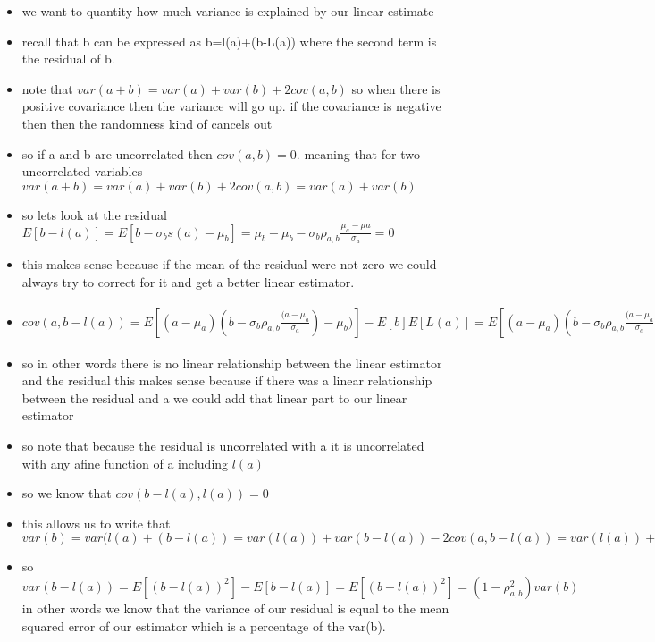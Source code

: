 \documentclass{article}
\begin{document}
\begin{itemize}
\section{property 3}
\item we want to quantity how much variance is explained by our linear estimate
\item recall that b can be expressed as b=l(a)+(b-L(a)) where the second term is the residual of b. 
\item note that $var(a+b)=var(a)+var(b)+2cov(a,b)$  so when there is positive covariance then the variance will go up. if the covariance is negative then then the randomness kind of cancels out 
\item so if a and b are uncorrelated then $cov(a,b)=0$. meaning that for two uncorrelated variables $var(a+b)=var(a)+var(b)+2cov(a,b)=var(a)+var(b)$
\item so lets look at the residual $E[b-l(a)]=E[b-\sigma_{b}s(a)-\mu_{b}]=\mu_{b}-\mu_{b}-\sigma_{b}\rho_{a,b}\frac{\mu_{a}-\mu{a}}{\sigma_{a}}=0$
\item this makes sense because if the mean of the residual were not zero we could always try to correct for it and get a better linear estimator.
\item $cov(a,b-l(a))=E[(a-\mu_{a})(b-\sigma_{b}\rho_{a,b}\frac{(a-\mu_{a}}{\sigma_{a}})-\mu_{b})]-E[b]E[L(a)]=E[(a-\mu_{a})(b-\sigma_{b}\rho_{a,b}\frac{(a-\mu_{a}}{\sigma_{a}})-\mu_{b})]=E[(\frac{\sigma_{a}(a-\mu_{a})}{\sigma_{a}})-(   (\frac{\sigma_{b}(b-\mu_{b})}{\sigma_{b}}) \rho_{a,b}s(a)) ]=\sigma_{a}\sigma_{b}E[s(a)(s(b)-\rho_{a,b}s(a)]=\sigma_{a}\sigma_{b}(E[s(a)(s(b)]-E[\rho_{a,b}s(a)])=\sigma_{a}\sigma_{b}\rho_{a,b}-\rho_{a,b}E[s(a)^2])=\sigma_{a}\sigma_{b}(\rho_{a,b}-\rho_{a,b})=0$
\item so in other words there is no linear relationship between the linear estimator and the residual this makes sense because if there was a linear relationship between the residual and a we could add that linear part to our linear estimator 
\item so note that because the residual is uncorrelated with a it is uncorrelated with any afine function of a including $l(a)$
\item so we know that $cov(b-l(a),l(a))=0$
\item this allows us to write that $var(b)=var(l(a)+(b-l(a))=var(l(a))+var(b-l(a))-2cov(a,b-l(a))=var(l(a))+var(b-l(a))$ 
\item so $var(b-l(a))=E[(b-l(a))^2]-E[b-l(a)]=E[(b-l(a))^2]=(1-\rho_{a,b}^2)var(b)$ in other words we know that the variance of our residual is equal to the mean squared error of our estimator which is a percentage of the var(b).  

\end{itemize}
\end{document}
